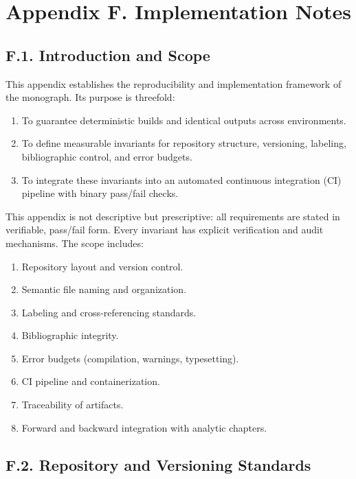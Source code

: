 \section{Appendix F. Implementation Notes}

\subsection*{F.1. Introduction and Scope}

This appendix establishes the reproducibility and implementation
framework of the monograph. Its purpose is threefold:
\begin{enumerate}
  \item To guarantee deterministic builds and identical outputs across
        environments.
  \item To define measurable invariants for repository structure,
        versioning, labeling, bibliographic control, and error budgets.
  \item To integrate these invariants into an automated continuous
        integration (CI) pipeline with binary pass/fail checks.
\end{enumerate}

\noindent This appendix is not descriptive but prescriptive:
all requirements are stated in verifiable, pass/fail form.
Every invariant has explicit verification and audit mechanisms.
The scope includes:
\begin{enumerate}
  \item Repository layout and version control.
  \item Semantic file naming and organization.
  \item Labeling and cross-referencing standards.
  \item Bibliographic integrity.
  \item Error budgets (compilation, warnings, typesetting).
  \item CI pipeline and containerization.
  \item Traceability of artifacts.
  \item Forward and backward integration with analytic chapters.
\end{enumerate}

\subsection*{F.2. Repository and Versioning Standards}

